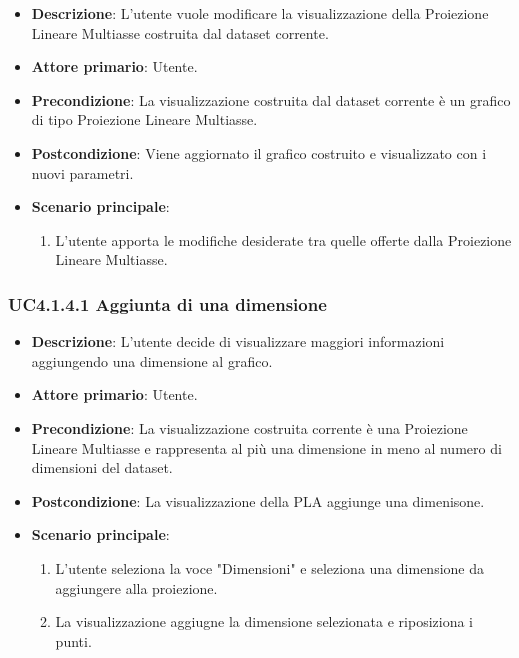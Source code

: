 \begin{itemize}
    \item \textbf{Descrizione}: L’utente vuole modificare la visualizzazione della Proiezione Lineare Multiasse
                                costruita dal dataset corrente.
	
    \item \textbf{Attore primario}: Utente.
    
    \item \textbf{Precondizione}:   La visualizzazione costruita dal dataset corrente è un grafico di tipo Proiezione Lineare Multiasse.
    \item \textbf{Postcondizione}:  Viene aggiornato il grafico costruito e visualizzato con i nuovi parametri.

	\item \textbf{Scenario principale}:
		\begin{enumerate}
            \item L'utente apporta le modifiche desiderate tra quelle offerte dalla Proiezione Lineare Multiasse.
        \end{enumerate}
\end{itemize}

\subsubsection{UC4.1.4.1 Aggiunta di una dimensione}
\label{subsec:uc4.1.4.1}
\begin{itemize}
    \item \textbf{Descrizione}: L’utente decide di visualizzare maggiori informazioni
                                aggiungendo una dimensione al grafico.

    \item \textbf{Attore primario}: Utente.
    
    \item \textbf{Precondizione}:   La visualizzazione costruita corrente è una Proiezione Lineare Multiasse
                                    e rappresenta al più una dimensione in meno al numero di dimensioni del dataset.
    \item \textbf{Postcondizione}:  La visualizzazione della PLA aggiunge una dimenisone.

	\item \textbf{Scenario principale}:
        \begin{enumerate}
            \item L'utente seleziona la voce "Dimensioni" e seleziona una dimensione da aggiungere alla proiezione.
            \item La visualizzazione aggiugne la dimensione selezionata e riposiziona i punti.
           
        \end{enumerate}
\end{itemize}

